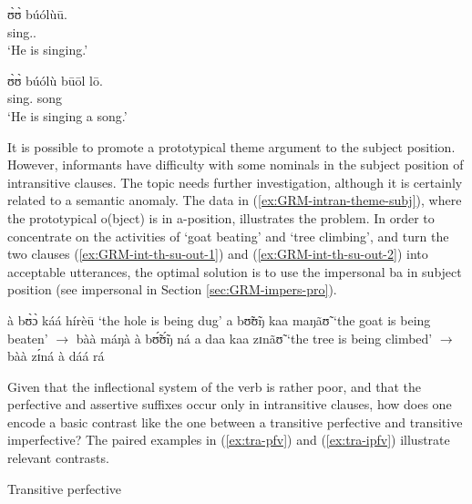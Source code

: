 \begin{exe}
\begin{exe}
\begin{exe}
\begin{exe}
\begin{exe}
\begin{exe}
\begin{exe}
\begin{exe}
\begin{exe}
\begin{exe}
\begin{exe}
\ex\label{ex:vp26.14.}
\gll ʊ̀ʊ̀ búólùū.\\
    {\psg} sing.{\ipfv.\foc}\\
\glt  `He is {\sc singing}.' 

\ex\label{ex:vp26.15.}
\gll  ʊ̀ʊ̀ búólù būōl lō.\\
    {\psg}  sing.{\ipfv} song {\foc}\\
\glt  `He is singing a {\sc song}.' 

\z
 \z


It is possible to promote a prototypical theme argument to the subject position. However,  informants have difficulty with some nominals in the subject position of intransitive clauses.   The topic needs further investigation, although it is certainly related to a semantic anomaly.  The data in (\ref{ex:GRM-intran-theme-subj}), where the  prototypical {\sc o}(bject) is in {\sc a}-position, illustrates the problem. In order to concentrate on the activities of  `goat beating' and `tree climbing',  and turn the two clauses (\ref{ex:GRM-int-th-su-out-1}) and (\ref{ex:GRM-int-th-su-out-2}) into acceptable utterances,  the optimal solution is to use the impersonal  {\sls ba} in subject position  (see impersonal  in Section \ref{sec:GRM-impers-pro}).



\ea\label{ex:GRM-intran-theme-subj}

\ea
à bʊ̀ɔ̀ káá hírèū  {\rm `the hole is being dug'}
\ex\label{ex:GRM-int-th-su-out-1}
\textasteriskcentered a bʊ̃ʊ̃ŋ   kaa maŋãʊ̃  {\rm  `the goat is being beaten' }
$\rightarrow$ {\sls 
bàà máŋà à bʊ̃́ʊ̃́ŋ ná}
\ex\label{ex:GRM-int-th-su-out-2}
\textasteriskcentered a daa kaa zɪnãʊ̃  {\rm   `the tree is being climbed'}   
$\rightarrow$ {\sls 
bàà zɪ́ná à dáá rá}


\z 
 \z


Given that  the inflectional system of the verb is rather poor, and that the 
perfective
and assertive suffixes occur only in intransitive clauses,  how does one
encode a basic contrast like the one between a transitive perfective and
transitive imperfective? The paired examples in (\ref{ex:tra-pfv}) and
(\ref{ex:tra-ipfv})  illustrate 
 relevant contrasts.\nolinebreak 
 


\ea\label{ex:tra-pfv}{\rm Transitive perfective}\\


\end{exe}
\end{exe}
\end{exe}
\end{exe}
\end{exe}
\end{exe}
\end{exe}
\end{exe}
\end{exe}
\end{exe}
\end{exe}
